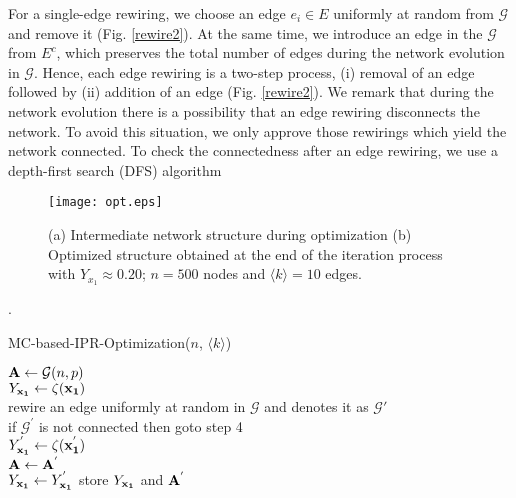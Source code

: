 \documentclass[envcountreset,oribibl]{llncs}
\begin{document}
For a single-edge rewiring, we choose an edge $e_i \in E$ uniformly at random from $\mathcal{G}$ and remove it (Fig. \ref{rewire2}). At the same time, we introduce an edge in the $\mathcal{G}$ from $E^c$, which preserves the total number of edges during the network evolution in $\mathcal{G}$. Hence, each edge rewiring is a two-step process, (i) removal of an edge followed by (ii) addition of an edge (Fig. \ref{rewire2}). 
We remark that during the network evolution there is a possibility that an edge rewiring disconnects the network. To avoid this situation, we only approve those rewirings which yield the network connected. To check the connectedness after an edge rewiring, we use a depth-first search (DFS) algorithm 
\begin{figure}[t]
\begin{center}
\texttt{[image: opt.eps]}
\caption{(a) Intermediate network structure during optimization (b) Optimized structure obtained at the end of the iteration process with $Y_{x_1} \approx 0.20$; $n=500$ nodes and $\langle k \rangle =10$ edges.}
\label{opt_net}
\end{center}
\end{figure}
\cite{algorithms_cormen_2009}.
\begin{algorithm}[!htb]
\label{monte_carlo}
\caption{MC-based-IPR-Optimization($n$, $\langle k \rangle$)}
\Indp
${\bf A} \leftarrow \mathcal{G}(n,p)$\\
$Y_{\bf x_1} \leftarrow \zeta(\bf x_1)$\\ 
{
  rewire an edge uniformly at random in $\mathcal{G}$ and denotes it as $\mathcal{G'}$ \\
  if $\mathcal{G^{'}}$ is not connected then goto step 4\\
  $Y_{\bf x_1}^{'} \leftarrow \zeta(\bf x_1^{'})$\\
      {
         ${\bf A} \leftarrow {\bf A^{'}}$  \\
         $Y_{\bf x_1} \leftarrow Y_{\bf x_1}^{'}$
       }
  store $Y_{\bf x_1}$ and ${\bf A^{'}}$
}  
\Indm
\end{algorithm}
\end{document}
